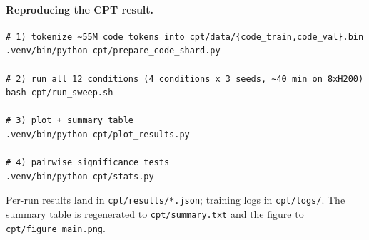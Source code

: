 \documentclass[10pt,letterpaper]{article}
\newcommand{\code}[1]{\texttt{\small #1}}
\begin{document}
\paragraph{Reproducing the CPT result.}
\begin{verbatim}
# 1) tokenize ~55M code tokens into cpt/data/{code_train,code_val}.bin
.venv/bin/python cpt/prepare_code_shard.py

# 2) run all 12 conditions (4 conditions x 3 seeds, ~40 min on 8xH200)
bash cpt/run_sweep.sh

# 3) plot + summary table
.venv/bin/python cpt/plot_results.py

# 4) pairwise significance tests
.venv/bin/python cpt/stats.py
\end{verbatim}
Per-run results land in \code{cpt/results/*.json}; training logs in \code{cpt/logs/}. The summary table is regenerated to \code{cpt/summary.txt} and the figure to \code{cpt/figure\_main.png}.

\printbibliography[heading=bibintoc,title={References}]
\end{document}
